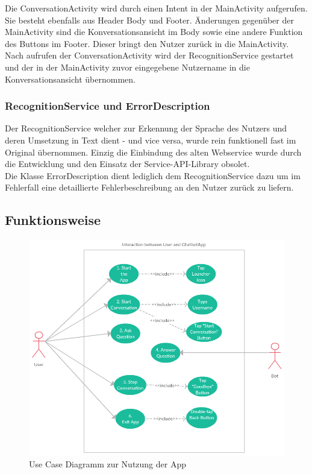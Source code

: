 		Die ConversationActivity wird durch einen Intent in der MainActivity aufgerufen. Sie besteht ebenfalls aus Header Body und Footer. Änderungen gegenüber der MainActivity sind die Konversationsansicht im Body sowie eine andere Funktion des Buttons im Footer. Dieser bringt den Nutzer zurück in die MainActivity.\\
		Nach aufrufen der ConversationActivity wird der RecognitionService gestartet und der in der MainActivity zuvor eingegebene Nutzername in die Konversationsansicht übernommen.\\
				
		\subsubsection{RecognitionService und ErrorDescription}\label{recogError}
		Der RecognitionService welcher zur Erkennung der Sprache des Nutzers und deren Umsetzung in Text dient - und vice versa, wurde rein funktionell fast im Original übernommen. Einzig die Einbindung des alten Webservice wurde durch die Entwicklung und den Einsatz der Service-API-Library obsolet.\\
		Die Klasse ErrorDescription dient lediglich dem RecognitionService dazu um im Fehlerfall eine detaillierte Fehlerbeschreibung an den Nutzer zurück zu liefern.

	\subsection{Funktionsweise}\label{funktion}
	
	\begin{figure}[htbp]
		\centering
		\includegraphics[height=0.9\textwidth]{dh/graphics/UseCaseChatbotApp.png}
		\caption{Use Case Diagramm zur Nutzung der App}
		\label{fig:usecaseapp}
	\end{figure} \leavevmode \\
	
